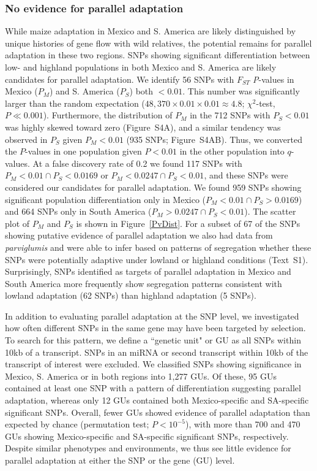 {{\subsubsection{No evidence for parallel adaptation}

While maize adaptation in Mexico and S. America are likely distinguished by unique histories of gene flow with wild relatives, the potential remains for parallel adaptation in these two regions.  
SNPs showing significant differentiation between low- and highland populations in both Mexico and S. America are likely candidates for parallel adaptation. 
We identify 56 SNPs with $F_{ST}$ \emph{P}-values in Mexico ($P_M$) and S. America ($P_S$) both $<0.01$.   
This number was significantly larger than the random expectation ($48,370\times 0.01 \times 0.01 \approx 4.8$; $\chi^2$-test, $P\ll0.001$).  Furthermore, the distribution of $P_M$ in the 712 SNPs with $P_S<0.01$ was highly skewed toward zero (Figure~S4A), and a similar tendency was observed in $P_S$ given $P_M<0.01$ (935 SNPs; Figure~S4AB).  Thus, we converted the $P$-values in one population given $P<0.01$ in the other population into $q$-values.  
At a false discovery rate of 0.2 we found 117 SNPs with $P_M<0.01 \cap P_S < 0.0169$ or $P_M<0.0247 \cap P_S < 0.01$, and these SNPs were considered our candidates for parallel adaptation.
We found 959 SNPs showing significant population differentiation only in Mexico ($P_M<0.01 \cap P_S > 0.0169$) and 664 SNPs only in South America  ($P_M>0.0247 \cap P_S < 0.01$).  The scatter plot of $P_M$ and $P_S$ is shown in Figure~\ref{PvDist}.  
For a subset of 67 of the SNPs showing putative evidence of parallel adaptation we also had data from \textit{parviglumis} and were able to infer based on patterns of segregation whether these SNPs were potentially adaptive under lowland or highland conditions (Text~S1).  Surprisingly, SNPs identified as targets of parallel adaptation in Mexico and South America more frequently show segregation patterns consistent with lowland adaptation (62 SNPs) than highland adaptation (5 SNPs). 

In addition to evaluating parallel adaptation at the SNP level, we investigated how often different SNPs in the same gene may have been targeted by selection. To search for this pattern, we define a ``genetic unit" or GU as all SNPs within 10kb of a transcript.  SNPs in an miRNA or second transcript within 10kb of the transcript of interest were excluded.  
We classified SNPs showing significance in Mexico, S. America or in both regions into 1,277 GUs. 
Of these, 95 GUs contained at least one SNP with a pattern of differentiation suggesting parallel adaptation, whereas only 12 GUs contained both Mexico-specific and SA-specific significant SNPs. 
Overall, fewer GUs showed evidence of parallel adaptation than expected by chance (permutation test; $P<10^{-5}$), with more than 700 and 470 GUs showing Mexico-specific and SA-specific significant SNPs, respectively.  
Despite similar phenotypes and environments, we thus see little evidence for parallel adaptation at either the SNP or the gene (GU) level.  

}}
